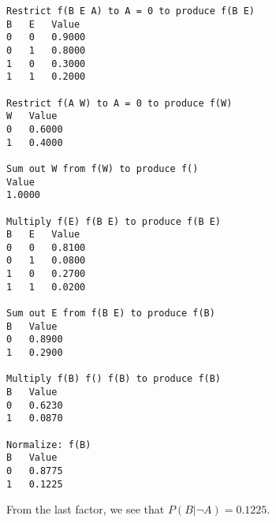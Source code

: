 \documentclass[12pt]{article}
\begin{document}
\begin{appendices}
\begin{verbatim}
Restrict f(B E A) to A = 0 to produce f(B E)
B	E	Value
0	0	0.9000
0	1	0.8000
1	0	0.3000
1	1	0.2000

Restrict f(A W) to A = 0 to produce f(W)
W	Value
0	0.6000
1	0.4000

Sum out W from f(W) to produce f()
Value
1.0000

Multiply f(E) f(B E) to produce f(B E)
B	E	Value
0	0	0.8100
0	1	0.0800
1	0	0.2700
1	1	0.0200

Sum out E from f(B E) to produce f(B)
B	Value
0	0.8900
1	0.2900

Multiply f(B) f() f(B) to produce f(B)
B	Value
0	0.6230
1	0.0870

Normalize: f(B)
B	Value
0	0.8775
1	0.1225
\end{verbatim}

From the last factor, we see that $P(B|\lnot A)=0.1225$.

\end{appendices}
\end{document}
